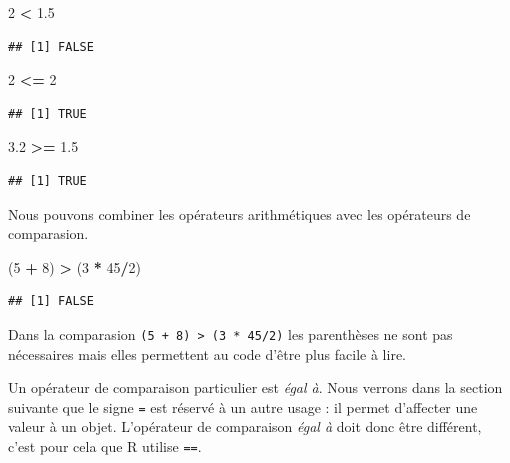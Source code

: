 \documentclass[]{book}
\makeatletter
\newenvironment{Shaded}{\begin{snugshade}}{\end{snugshade}}
\newcommand{\DecValTok}[1]{\textcolor[rgb]{0.00,0.00,0.81}{#1}}
\newcommand{\FloatTok}[1]{\textcolor[rgb]{0.00,0.00,0.81}{#1}}
\newcommand{\StringTok}[1]{\textcolor[rgb]{0.31,0.60,0.02}{#1}}
\newcommand{\OperatorTok}[1]{\textcolor[rgb]{0.81,0.36,0.00}{\textbf{#1}}}
\newcommand{\NormalTok}[1]{#1}
\newenvironment{kframe}{%
\medskip{}
\setlength{\fboxsep}{.8em}
 \def\at@end@of@kframe{}%
 \ifinner\ifhmode%
  \def\at@end@of@kframe{\end{minipage}}%
  \begin{minipage}{\columnwidth}%
 \fi\fi%
 \def\FrameCommand##1{\hskip\@totalleftmargin \hskip-\fboxsep
 \colorbox{shadecolor}{##1}\hskip-\fboxsep
     \hskip-\linewidth \hskip-\@totalleftmargin \hskip\columnwidth}%
 \MakeFramed {\advance\hsize-\width
   \@totalleftmargin\z@ \linewidth\hsize
   \@setminipage}}%
 {\par\unskip\endMakeFramed%
 \at@end@of@kframe}
\newenvironment{rmdblock}[1]
  {
  \begin{itemize}
  \renewcommand{\labelitemi}{
    \raisebox{-.7\height}[0pt][0pt]{
      {\setkeys{Gin}{width=3em,keepaspectratio}\texttt{[image: myIcons/\#1]}} %
    }
  }
  \setlength{\fboxsep}{1em}
  \begin{kframe}
  \item
  }
  {
  \end{kframe}
  \end{itemize}
  }
\newenvironment{rmdstyle}     %
  {\begin{rmdblock}{style}}   %
  {\end{rmdblock}}            %
\makeatother
\begin{document}
\begin{Shaded}
\begin{Highlighting}[]
\DecValTok{2} \OperatorTok{<}\StringTok{ }\FloatTok{1.5}
\end{Highlighting}
\end{Shaded}

\begin{verbatim}
## [1] FALSE
\end{verbatim}

\begin{Shaded}
\begin{Highlighting}[]
\DecValTok{2} \OperatorTok{<=}\StringTok{ }\DecValTok{2}
\end{Highlighting}
\end{Shaded}

\begin{verbatim}
## [1] TRUE
\end{verbatim}

\begin{Shaded}
\begin{Highlighting}[]
\FloatTok{3.2} \OperatorTok{>=}\StringTok{ }\FloatTok{1.5}
\end{Highlighting}
\end{Shaded}

\begin{verbatim}
## [1] TRUE
\end{verbatim}

Nous pouvons combiner les opérateurs arithmétiques avec les opérateurs
de comparasion.

\begin{Shaded}
\begin{Highlighting}[]
\NormalTok{(}\DecValTok{5} \OperatorTok{+}\StringTok{ }\DecValTok{8}\NormalTok{) }\OperatorTok{>}\StringTok{ }\NormalTok{(}\DecValTok{3} \OperatorTok{*}\StringTok{ }\DecValTok{45}\OperatorTok{/}\DecValTok{2}\NormalTok{) }
\end{Highlighting}
\end{Shaded}

\begin{verbatim}
## [1] FALSE
\end{verbatim}

\begin{rmdstyle}
Dans la comparasion \texttt{(5\ +\ 8)\ \textgreater{}\ (3\ *\ 45/2)} les
parenthèses ne sont pas nécessaires mais elles permettent au code d'être
plus facile à lire.
\end{rmdstyle}

Un opérateur de comparaison particulier est \emph{égal à}. Nous verrons
dans la section suivante que le signe \texttt{=} est réservé à un autre
usage : il permet d'affecter une valeur à un objet. L'opérateur de
comparaison \emph{égal à} doit donc être différent, c'est pour cela que
R utilise \texttt{==}.
\end{document}
